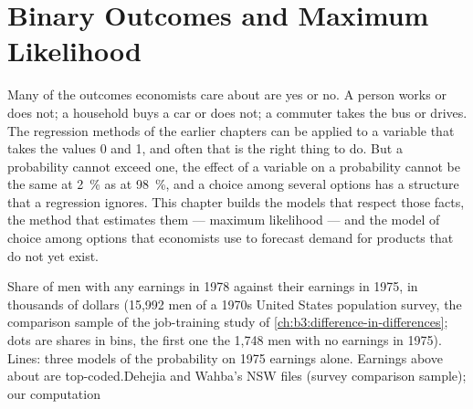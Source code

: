 \chapter{Binary Outcomes and Maximum Likelihood}\label{ch:b3:binary-outcomes}

Many of the outcomes economists care about are yes or no. A person works or
does not; a household buys a car or does not; a commuter takes the bus or
drives. The regression methods of the earlier chapters can be applied to a
variable that takes the values 0 and 1, and often that is the right thing to
do. But a probability cannot exceed one, the effect of a variable on a
probability cannot be the same at 2~\% as at 98~\%, and a choice among several
options has a structure that a regression ignores. This chapter builds the
models that respect those facts, the method that estimates them --- maximum
likelihood --- and the model of choice among options that economists use to
forecast demand for products that do not yet exist.

\begin{openingchart}{Share of men with any earnings in 1978 against their
earnings in 1975, in thousands of dollars (15{,}992 men of a 1970s United
States population survey, the comparison sample of the job-training study of
\cref{ch:b3:difference-in-differences}; dots are shares in bins, the first one
the 1{,}748 men with no earnings in 1975). Lines: three models of the probability
on 1975 earnings alone. Earnings above about  are
top-coded.}{Dehejia and Wahba's NSW files (survey comparison sample); our
computation}
\end{openingchart}

